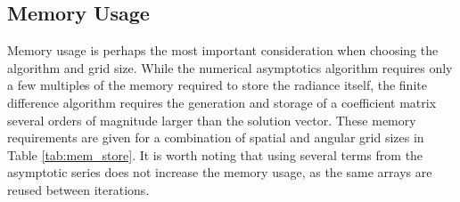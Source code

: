 
\subsection{Memory Usage}
Memory usage is perhaps the most important consideration when choosing the algorithm and grid size.
While the numerical asymptotics algorithm requires only a few multiples of the memory required to store the radiance itself, the finite difference algorithm requires the generation and storage of a coefficient matrix several orders of magnitude larger than the solution vector.
These memory requirements are given for a combination of spatial and angular grid sizes in Table \ref{tab:mem_store}.
It is worth noting that using several terms from the asymptotic series does not increase the memory usage, as the same arrays are reused between iterations.

